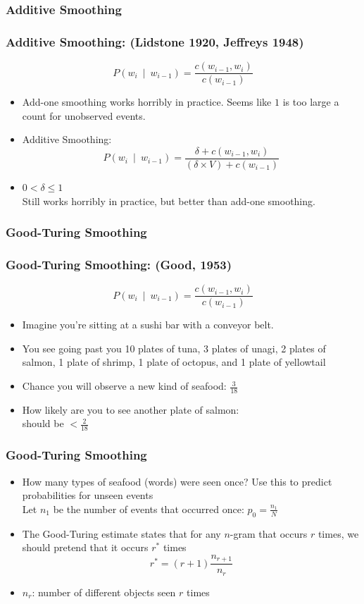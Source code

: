 \documentclass{beamer}
\begin{document}
\subsubsection{Additive Smoothing}

\begin{frame}
\frametitle{Additive Smoothing: (Lidstone 1920, Jeffreys 1948)} 
\[ P(w_i~\mid~w_{i-1}) = \frac{ c(w_{i-1},w_i) } { c(w_{i-1}) } \]
\begin{itemize}[<+->]
\item Add-one smoothing works horribly in practice. Seems like $1$ is too large a count for unobserved events.
\item Additive Smoothing:
\[ P(w_i~\mid~w_{i-1}) = \frac{ \delta + c(w_{i-1},w_i) } { (\delta \times V) + c(w_{i-1}) } \]
\item $0 < \delta \leq 1$ \\
Still works horribly in practice, but better than add-one smoothing.
\end{itemize}
\end{frame}

\subsubsection{Good-Turing Smoothing}

\begin{frame}
\frametitle{Good-Turing Smoothing: (Good, 1953)} 
\[ P(w_i~\mid~w_{i-1}) = \frac{ c(w_{i-1},w_i) } { c(w_{i-1}) } \]
\begin{itemize}[<+->]
\item Imagine you're sitting at a sushi bar with a conveyor belt. 
\item You see going past you  { \color{blue} 10} plates of tuna,  { \color{blue} 3} plates of unagi,  { \color{blue} 2} plates of salmon,  { \color{blue} 1} plate of shrimp,  { \color{blue} 1} plate of octopus, and  { \color{blue} 1} plate of yellowtail
\item Chance you will observe a \alert{new} kind of seafood: {\color{blue} $\frac{3}{18}$}
\item How likely are you to see another plate of salmon: \\
should be { \color{blue} $< \frac{2}{18}$ }
\end{itemize}
\end{frame}

\begin{frame}
\frametitle{Good-Turing Smoothing}
\begin{itemize}[<+->]
\item How many types of seafood (words) were seen once? Use this to predict probabilities for unseen events\\
Let $n_1$ be the number of events that occurred once: 
{ \color{blue} $p_0 = \frac{ n_1 }{ N } $}
\item The Good-Turing estimate states that for any $n$-gram that occurs $r$ times, we should pretend that it occurs $r^\ast$ times
{\color{blue} \[ r^\ast = (r+1) \frac{ n_{r+1} }{ n_r } \] }
\item {\color{blue} $n_r$}: number of different objects seen $r$ times
\end{itemize}
\end{frame}
\end{document}

